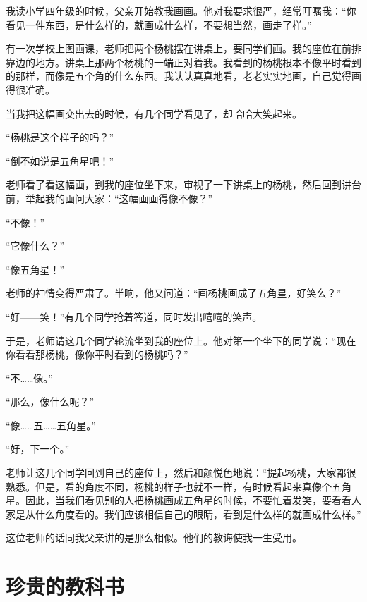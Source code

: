 \documentclass[12pt,UTF-8,openany]{ctexbook}
\begin{document}
\begin{Large}
    
    我读小学四年级的时候，父亲开始教我画画。他对我要求很严，经常叮嘱我：“你看见一件东西，是什么样的，就画成什么样，不要想当然，画走了样。”
    
    有一次学校上图画课，老师把两个杨桃摆在讲桌上，要同学们画。我的座位在前排靠边的地方。讲桌上那两个杨桃的一端正对着我。我看到的杨桃根本不像平时看到的那样，而像是五个角的什么东西。我认认真真地看，老老实实地画，自己觉得画得很准确。
    
    当我把这幅画交出去的时候，有几个同学看见了，却哈哈大笑起来。
    
    “杨桃是这个样子的吗？”
    
    “倒不如说是五角星吧！”
    
    老师看了看这幅画，到我的座位坐下来，审视了一下讲桌上的杨桃，然后回到讲台前，举起我的画问大家：“这幅画画得像不像？”
    
    “不像！”
    
    “它像什么？”
    
    “像五角星！”
    
    老师的神情变得严肃了。半晌，他又问道：“画杨桃画成了五角星，好笑么？”
    
    “好——笑！”有几个同学抢着答道，同时发出嘻嘻的笑声。
    
    于是，老师请这几个同学轮流坐到我的座位上。他对第一个坐下的同学说：“现在你看看那杨桃，像你平时看到的杨桃吗？”
    
    “不……像。”
    
    “那么，像什么呢？”
    
    “像……五……五角星。”
    
    “好，下一个。”
    
    老师让这几个同学回到自己的座位上，然后和颜悦色地说：“提起杨桃，大家都很熟悉。但是，看的角度不同，杨桃的样子也就不一样，有时候看起来真像个五角星。因此，当我们看见别的人把杨桃画成五角星的时候，不要忙着发笑，要看看人家是从什么角度看的。我们应该相信自己的眼睛，看到是什么样的就画成什么样。”
    
    这位老师的话同我父亲讲的是那么相似。他们的教诲使我一生受用。
    
\end{Large}

\chapter{珍贵的教科书}
\end{document}
